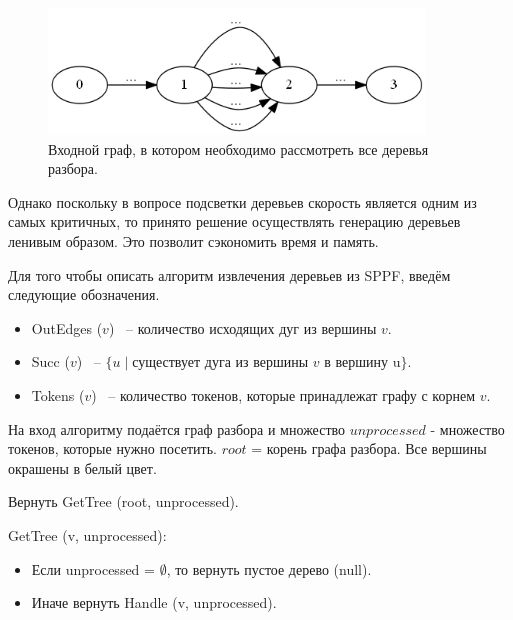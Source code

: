 \begin{figure}[h]
\centering
\includegraphics[width=100mm]{Pictures/Bad_case.png}
\caption{Входной граф, в котором необходимо рассмотреть все деревья разбора.}
\label{bad_case}
\end{figure}

Однако поскольку в вопросе подсветки деревьев скорость является одним из самых критичных, то принято решение осуществлять генерацию деревьев ленивым образом. Это позволит сэкономить время и память. 

Для того чтобы описать алгоритм извлечения деревьев из SPPF, введём следующие обозначения.
\begin{itemize}
\item OutEdges ($v$) ~-- количество исходящих дуг из вершины $v$. 
\item Succ ($v$) ~-- $\{u \mid \mbox{существует дуга из вершины } v \mbox{ в вершину u} \}$.
\item Tokens ($v$) ~-- количество токенов, которые принадлежат графу с корнем $v$.
\end{itemize}

На вход алгоритму подаётся граф разбора и множество $unprocessed$ - множество токенов, которые нужно посетить. $root$ = корень графа разбора. Все вершины окрашены в белый цвет. 

Вернуть GetTree (root, unprocessed).

GetTree (v, unprocessed):
\begin{itemize}
\item Если unprocessed = $\emptyset$, то вернуть пустое дерево (null).
\item Иначе вернуть Handle (v, unprocessed).
\end{itemize}

